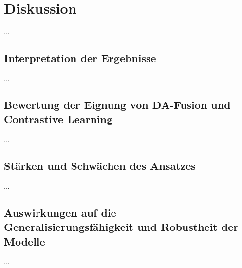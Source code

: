 \chapter{Diskussion}

...

\section{Interpretation der Ergebnisse}

...

\section{Bewertung der Eignung von DA-Fusion und Contrastive Learning}

...

\section{Stärken und Schwächen des Ansatzes}

...

\section{Auswirkungen auf die Generalisierungsfähigkeit und Robustheit der Modelle}
	
...